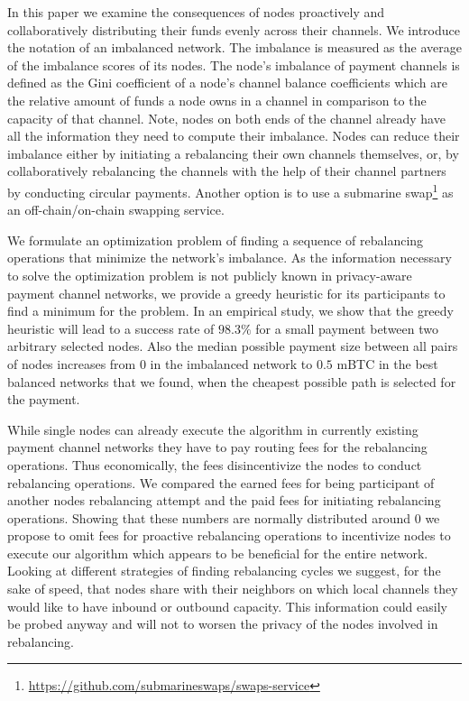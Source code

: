 \documentclass[conference]{IEEEtran}
\begin{document}
In this paper we examine the consequences of nodes proactively and collaboratively distributing their funds evenly across their channels.
We introduce the notation of an imbalanced network.
The imbalance is measured as the average of the imbalance scores of its nodes.
The node's imbalance of payment channels is defined as the Gini coefficient of a node's channel balance coefficients which are the relative amount of funds a node owns in a channel in comparison to the capacity of that channel.
Note, nodes on both ends of the channel already have all the information they need to compute their imbalance. 
Nodes can reduce their imbalance either by initiating a rebalancing their own channels themselves, or, by collaboratively rebalancing the channels with the help of their channel partners by conducting circular payments.
Another option is to use a submarine swap\footnote{\url{https://github.com/submarineswaps/swaps-service}} as an off-chain/on-chain swapping service.

We formulate an optimization problem of finding a sequence of rebalancing operations that minimize the network's imbalance.
As the information necessary to solve the optimization problem is not publicly known in privacy-aware payment channel networks, we provide a greedy heuristic for its participants to find a minimum for the problem. 
In an empirical study, we show that the greedy heuristic will lead to a success rate of $98.3\%$ for a small payment between two arbitrary selected nodes.
Also the median possible payment size between all pairs of nodes increases from $0$ in the imbalanced network to $0.5$ mBTC in the best balanced networks that we found, when the cheapest possible path is selected for the payment.

While single nodes can already execute the algorithm in currently existing payment channel networks they have to pay routing fees for the rebalancing operations.
Thus economically, the fees disincentivize the nodes to conduct rebalancing operations.
We compared the earned fees for being participant of another nodes rebalancing attempt and the paid fees for initiating rebalancing operations.
Showing that these numbers are normally distributed around $0$ we propose to omit fees for proactive rebalancing operations to incentivize nodes to execute our algorithm which appears to be beneficial for the entire network. 
Looking at different strategies of finding rebalancing cycles we suggest, for the sake of speed, that nodes share with their neighbors on which local channels they would like to have inbound or outbound capacity.
This information could easily be probed anyway and will not to worsen the privacy of the nodes involved in rebalancing.
\end{document}
